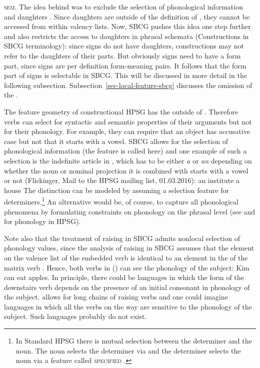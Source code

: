 \documentclass[output=paper
	        ,collection
	        ,collectionchapter
 	        ,biblatex
                ,babelshorthands
                ,newtxmath
                ,draftmode
                ,colorlinks, citecolor=brown
]{langscibook}
\begin{document}
\textsc{sem}. The idea behind \synsem was to exclude the selection of phonological information and
daughters \citep[]{ps2}. Since daughters are outside of the definition of , they cannot be accessed from
within valency lists. Now, SBCG pushes this idea one step further and also restricts the access
to daughters in phrasal schemata (Constructions in SBCG terminology): since signs do not have
daughters, constructions may not refer to the daughters of their parts. But obviously signs need to
have a form part, since signs are per definition form-meaning pairs. It follows that the form part of
signs is selectable in SBCG. This will be discussed in more detail in the following
subsection. Subsection~\ref{sec-local-feature-sbcg} discusses the omission of the \localf.



The feature geometry of constructional HPSG has the \phonv outside of \synsem. Therefore verbs can
select for syntactic and semantic properties of their arguments but not for their phonology. For
example, they can require that an object has accusative case but not that it starts with a
vowel. SBCG allows for the selection of phonological information (the feature is called \form here)
and one example of such a selection is the indefinite article in , which has to be either \emph{a} or
\emph{an} depending on whether the noun or nominal projection it is combined with starts with a
vowel or not (Flickinger, Mail to the HPSG mailing list, 01.03.2016):
\eal
\ex an institute
\ex a  house
\zl
The distinction can be modeled by assuming a selection feature for determiners.\footnote{%
  In Standard HPSG there is mutual selection between the determiner and the noun. The noun selects
  the determiner via \spr and the determiner selects the noun via a feature called
  \textsc{specified} \citep[--54]{ps2}. 
} An alternative would be, of course, to capture all phonological phenomena by formulating constraints on phonology on the
phrasal level (see \citealp{BK94b} and \citealp{Walther99a-u} for phonology in HPSG).

Note also that the treatment of raising in SBCG admits nonlocal selection of phonology
values, since the analysis of raising in SBCG assumes that the element on the valence list of the
embedded verb is identical to an element in the \argstl of the matrix verb \citep[]{Sag2012a}. Hence, both verbs in () can see the phonology of the subject:
\ea
Kim can eat apples.
\z
In principle, there could be languages in which the form of the downstairs verb depends on the
presence of an initial consonant in phonology of the subject.  allows for long chains of
raising verbs and one could imagine languages in which all the verbs on the way are sensitive to the
phonology of the subject. Such languages probably do not exist.
\end{document}
